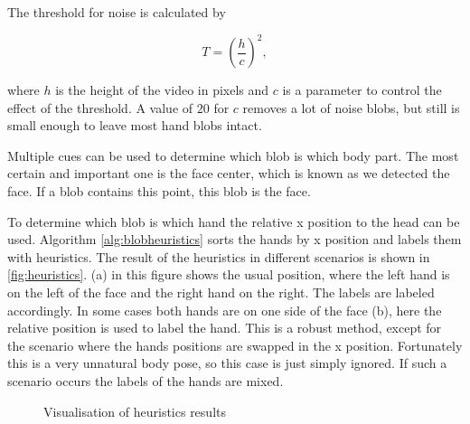 The threshold for noise is calculated by

\begin{equation}
T = (\frac{h}{c})^2,
\end{equation}

where $h$ is the height of the video in pixels and $c$ is a parameter to control the effect of the threshold. A value of $20$ for $c$ removes a lot of noise blobs, but still is small enough to leave most hand blobs intact.

Multiple cues can be used to determine which blob is which body part. The most  certain and important one is the face center, which is known as we detected the face. If a blob contains this point, this blob is the face. 

To determine which blob is which hand the relative x position to the head can be used. Algorithm \autoref{alg:blobheuristics} sorts the hands by x position and labels them with heuristics. The result of the heuristics in different scenarios is shown in \autoref{fig:heuristics}. (a) in this figure shows the usual position, where the left hand is on the left of the face and the right hand on the right. The labels are labeled accordingly. In some cases both hands are on one side of the face (b), here the relative position is used to label the hand. This is a robust method, except for the scenario where the hands positions are swapped in the x position. Fortunately this is a very unnatural body pose, so this case is just simply ignored. If such a scenario occurs the labels of the hands are mixed. 

\begin{figure}[htbp]
\centering
\hspace{0.02\linewidth}
\hspace{0.02\linewidth}
\hspace{0.02\linewidth}
\caption{Visualisation of heuristics results}
\label{fig:heuristics}
\end{figure}



